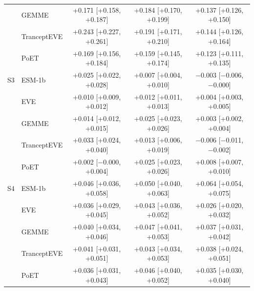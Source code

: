 \begin{tabular}{llccc}
 & GEMME & +0.171 [+0.158, +0.187] & +0.184 [+0.170, +0.199] & +0.137 [+0.126, +0.150] \\
 & TranceptEVE & +0.243 [+0.227, +0.261] & +0.191 [+0.171, +0.210] & +0.144 [+0.126, +0.164] \\
 & PoET & +0.169 [+0.156, +0.184] & +0.159 [+0.145, +0.174] & +0.123 [+0.111, +0.135] \\
\midrule
S3 & ESM-1b & +0.025 [+0.022, +0.028] & +0.007 [+0.004, +0.010] & $-$0.003 [$-$0.006, $-$0.000] \\
 & EVE & +0.010 [+0.009, +0.012] & +0.012 [+0.011, +0.013] & +0.004 [+0.003, +0.005] \\
 & GEMME & +0.014 [+0.012, +0.015] & +0.025 [+0.023, +0.026] & +0.003 [+0.002, +0.004] \\
 & TranceptEVE & +0.033 [+0.024, +0.040] & +0.013 [+0.006, +0.019] & $-$0.006 [$-$0.011, $-$0.002] \\
 & PoET & +0.002 [$-$0.000, +0.004] & +0.025 [+0.023, +0.026] & +0.008 [+0.007, +0.010] \\
\midrule
S4 & ESM-1b & +0.046 [+0.036, +0.058] & +0.050 [+0.040, +0.063] & +0.064 [+0.054, +0.075] \\
 & EVE & +0.036 [+0.029, +0.045] & +0.043 [+0.036, +0.052] & +0.026 [+0.020, +0.032] \\
 & GEMME & +0.040 [+0.034, +0.046] & +0.047 [+0.041, +0.053] & +0.037 [+0.031, +0.042] \\
 & TranceptEVE & +0.041 [+0.031, +0.051] & +0.043 [+0.034, +0.053] & +0.038 [+0.024, +0.051] \\
 & PoET & +0.036 [+0.031, +0.043] & +0.046 [+0.040, +0.052] & +0.035 [+0.030, +0.040] \\
\bottomrule
\end{tabular}

